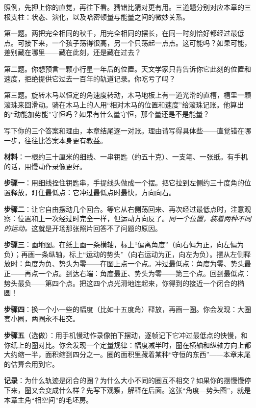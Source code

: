 
照例，先押上你的直觉，再往下看。猜错比猜对更有用。三道题分别对应本章的三根支柱：状态、演化，以及哈密顿量与能量之间的微妙关系。

第一题。两把完全相同的秋千，用完全相同的摆长，在同一时刻恰好都经过最低点。可接下来，一个孩子荡得很高，另一个只荡起一点点。这可能吗？如果可能，差别藏在哪里——藏在此刻，还是藏在过去？

第二题。你想预言一颗小行星一年后的位置。天文学家只肯告诉你它此刻的位置和速度，拒绝提供它过去一百年的轨道记录。你吃亏了吗？

第三题。旋转木马以恒定的角速度转动，木马地板上有一道光滑的直槽，槽里一颗滚珠来回滑动。骑在木马上的人用“相对木马的位置和速度”给滚珠记账。他算出的“动能加势能”守恒吗？如果有什么量守恒，那个量还是不是能量？

写下你的三个答案和理由，本章结尾逐一对账。理由请写得具体些——直觉错在哪一步，往往比答案本身更有教益。


\begin{experiment}[一根钥匙摆的“地图”]
\textbf{材料}：一根约三十厘米的细线、一串钥匙（约五十克）、一支笔、一张纸。有手机的话，用慢动作录像更好。

\textbf{步骤一}：用细线拴住钥匙串，手提线头做成一个摆。把它拉到左侧约三十度角的位置释放，盯住最低点：它冲过最低点时最快，方向向右。

\textbf{步骤二}：让它自由摆动几个回合。等它从右侧荡回来、再次经过最低点时，注意观察：位置和上一次经过时完全一样，但运动方向反了。\emph{同一个位置，装着两种不同的运动。}这就是开场那张照片回答不了问题的原因。

\textbf{步骤三}：画地图。在纸上画一条横轴，标上“偏离角度”（向右偏为正，向左偏为负）；再画一条纵轴，标上“运动的势头”（向右运动为正，向左为负）。摆从左侧释放时：角度为负、势头为零——在图上点一个点。冲过最低点：角度为零、势头最正——再点一个点。到达右端：角度最正、势头为零——第三个点。回到最低点：势头最负——第四个点。把这四个点光滑地连起来，你得到的接近一个闭合的椭圆！

\textbf{步骤四}：换一个小一些的幅度（比如十五度角）释放，再画一圈。你会发现：大圈套小圈，两圈永不相交。

\textbf{步骤五}（选做）：用手机慢动作录像拍下摆动，逐帧记下它冲过最低点的快慢，和你纸上的圈对比。你会发现一个定量规律：幅度减半时，圈在横轴和纵轴方向上都大约缩一半，面积缩到四分之一。圈的面积里藏着某种“守恒的东西”——本章末尾的估算会用到它。

\textbf{记录}：为什么轨迹是闭合的圈？为什么大小不同的圈互不相交？如果你的摆慢慢停下来，圈又会变成什么样？先写下观察，解释在后面。这张“角度—势头图”，就是本章主角“相空间”的毛坯房。
\end{experiment}

